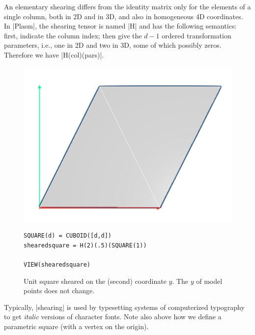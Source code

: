 \begin{coding}
An elementary shearing differs from the identity matrix only for the elements of a single column, both in 2D and in 3D, and also in homogeneous 4D coordinates. 
In |Plasm|, the shearing tensor is named |H| and has the following semantics: first, indicate the column index; then give the $d-1$ ordered transformation parameters, i.e., one in 2D and two in 3D, some of which possibly zeros. Therefore we have |H(col)(pars)|.

\begin{figure}[htbp] %
\begin{minipage}[c]{0.35\textwidth}
   \includegraphics[width=\linewidth]{chapter-04/figs/shear2D} 
\end{minipage}\hfill
\begin{minipage}[c]{0.60\textwidth}
\begin{lstlisting}[language=JuliaLocal, style=julia, mathescape=false]
SQUARE(d) = CUBOID([d,d])
shearedsquare = H(2)(.5)(SQUARE(1))

VIEW(shearedsquare)
\end{lstlisting}
   \caption{Unit square sheared on the (second) coordinate $y$. The $y$ of model points does not change.}
\end{minipage}
\end{figure}

Typically, |shearing| is used by typesetting systems of computerized typography to get \emph{italic} versions of character fonts. Note also above how we define a parametric square (with a vertex on the origin).


\end{coding}
